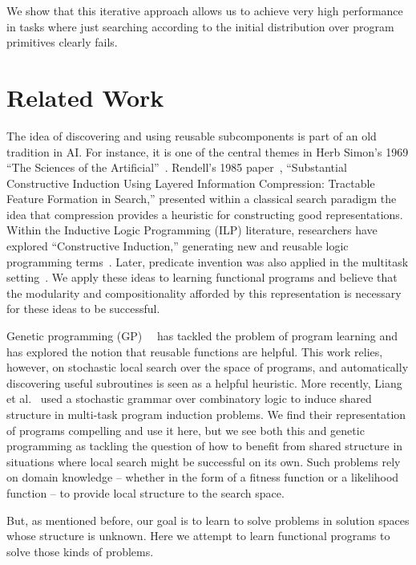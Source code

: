 \documentclass{article}
\begin{document}
We show that this iterative approach allows us to achieve very high
performance in tasks where just searching according to the initial
distribution over program primitives clearly fails.


\section{Related Work}
The idea of discovering and using reusable subcomponents is part of an
old tradition in AI. For instance, it is one of the central themes in
Herb Simon's 1969 ``The Sciences of the
Artificial''~\cite{simon1996sciences}. Rendell's 1985
paper~\cite{DBLP:conf/ijcai/Rendell85}, ``Substantial Constructive
Induction Using Layered Information Compression: Tractable Feature
Formation in Search,'' presented within a classical search paradigm
the idea that compression provides a heuristic for constructing good
representations. Within the Inductive Logic Programming (ILP)
literature, researchers have explored ``Constructive Induction,''
generating new and reusable logic programming
terms~\cite{DBLP:conf/ijcai/Muggleton87}. Later, predicate invention
was also applied in the multitask
setting~\cite{DBLP:conf/ilp/KhanMP98}. We apply these ideas to
learning functional programs and believe that the modularity and
compositionality afforded by this representation is necessary for
these ideas to be successful.


Genetic programming
(GP)~\cite{DBLP:conf/foga/Koza92}~\cite{DBLP:conf/ices/KozaBAK96} has
tackled the problem of program learning and has explored the notion
that reusable functions are helpful. This work relies, however, on
stochastic local search over the space of programs, and automatically
discovering useful subroutines is seen as a helpful heuristic. More
recently, Liang et al.~\cite{liang10programs} used a stochastic
grammar over combinatory logic to induce shared structure in
multi-task program induction problems. We find their representation of
programs compelling and use it here, but we see both this and genetic
programming as tackling the question of how to benefit from shared
structure in situations where local search might be successful on its
own. Such problems rely on domain knowledge -- whether in the form of
a fitness function or a likelihood function -- to provide local
structure to the search space.

But, as mentioned before, our goal is to learn to solve problems in
solution spaces whose structure is unknown. Here we attempt to learn
functional programs to solve those kinds of problems.  \\
\end{document}
